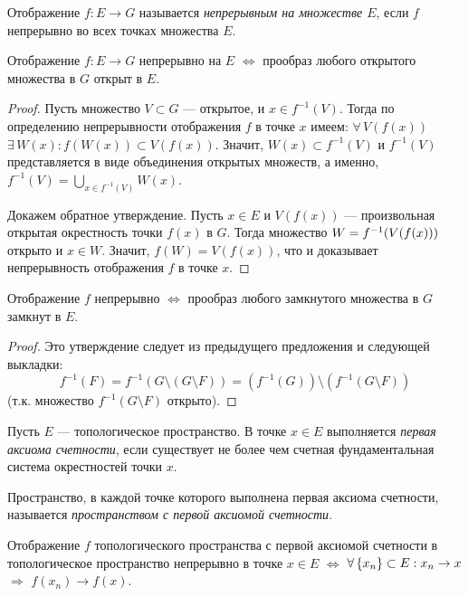 \documentclass[10pt]{article}
\newcommand*{\p}[1]{#1\nobreak\discretionary{}{\hbox{$\mathsurround=0pt #1$}}{}}
\begin{document}
\begin{df}
Отображение $f\colon E\to G$ называется \emph{непрерывным на
множестве $E$}, если $f$ непрерывно во всех точках множества $E$.
\end{df}

\begin{prop}
Отображение $f\colon E\to G$ непрерывно на $E$ $\Leftrightarrow$
прообраз любого открытого множества в $G$ открыт в $E$.
\end{prop}

\begin{proof}
Пусть множество $V\subset G$ --- открытое, и $x\in f^{-1}(V)$. Тогда
по определению непрерывности отображения $f$ в точке $x$ имеем:
$\forall\,V(f(x))$\;\;$\exists\,W(x):f(W(x))\subset V(f(x))$.
Значит, $W(x)\subset f^{-1}(V)$ и $f^{-1}(V)$ представляется в виде
объединения открытых множеств, а именно,
$f^{-1}(V)=\bigcup\limits_{x\in f^{-1}(V)}W(x)$.

Докажем обратное утверждение. Пусть $x\in E$ и $V(f(x))$ ---
произвольная открытая окрестность точки $f(x)$ в $G$. Тогда
множество $W\p=f^{-1}(V(f(x)))$ открыто и $x\in W$. Значит,
$f(W)=V(f(x))$, что и доказывает непрерывность отображения $f$ в
точке $x$.
\end{proof}

\begin{prop}\label{predl.zamk->zamk}
Отображение $f$ непрерывно $\Leftrightarrow$ прообраз любого
замкнутого множества в $G$ замкнут в $E$.
\end{prop}

\begin{proof}
Это утверждение следует из предыдущего предложения и следующей
выкладки: $$f^{-1}(F)=f^{-1}(G\setminus (G\setminus F))=(f^{-1}(G))
\setminus(f^{-1}(G\setminus F))$$ (т.к. множество $f^{-1}(G\setminus
F)$ открыто).
\end{proof}

\begin{df}
Пусть $E$ --- топологическое пространство. В точке $x\in E$
выполняется \emph{первая аксиома счетности}, если существует не
более чем счетная фундаментальная система окрестностей точки $x$.

Пространство, в каждой точке которого выполнена первая аксиома
счетности, называется \emph{пространством с первой аксиомой
счетности}.
\end{df}

\begin{theorem}
Отображение $f$ топологического пространства с первой аксиомой
счетности в топологическое пространство непрерывно в точке $x\in E$
$\Leftrightarrow$ $\forall\,\{x_n\}\p\subset E:x_n\to x$
$\Rightarrow$ $f(x_n)\to f(x)$.
\end{theorem}
\end{document}
